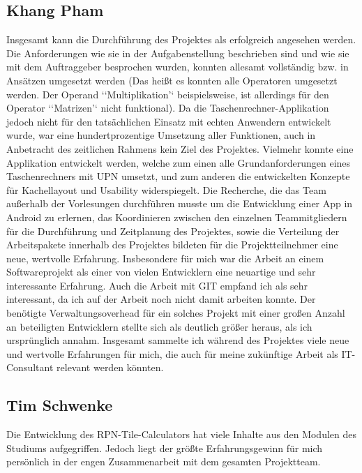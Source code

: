 \subsection{Khang Pham}
Insgesamt kann die Durchführung des Projektes als erfolgreich angesehen werden. Die Anforderungen wie sie in der Aufgabenstellung beschrieben sind und wie sie mit dem Auftraggeber besprochen wurden, konnten allesamt vollständig bzw. in Ansätzen umgesetzt werden (Das heißt es konnten alle Operatoren umgesetzt werden. Der Operand ‘‘Multiplikation’‘ beispielsweise, ist allerdings für den Operator ‘‘Matrizen’‘ nicht funktional). Da die Taschenrechner-Applikation jedoch nicht für den tatsächlichen Einsatz mit echten Anwendern entwickelt wurde, war eine hundertprozentige Umsetzung aller Funktionen, auch in Anbetracht des zeitlichen Rahmens kein Ziel des Projektes. Vielmehr konnte eine Applikation entwickelt werden, welche zum einen alle Grundanforderungen eines Taschenrechners mit UPN umsetzt, und zum anderen die entwickelten Konzepte für Kachellayout und Usability widerspiegelt. Die Recherche, die das Team außerhalb der Vorlesungen durchführen musste um die Entwicklung einer App in Android zu erlernen, das Koordinieren zwischen den einzelnen Teammitgliedern für die Durchführung und Zeitplanung des Projektes, sowie die Verteilung der Arbeitspakete innerhalb des Projektes bildeten für die Projektteilnehmer eine neue, wertvolle Erfahrung.
Insbesondere für mich war die Arbeit an einem Softwareprojekt als einer von vielen Entwicklern eine neuartige und sehr interessante Erfahrung. Auch die Arbeit mit GIT empfand ich als sehr interessant, da ich auf der Arbeit noch nicht damit arbeiten konnte. Der benötigte Verwaltungsoverhead für ein solches Projekt mit einer großen Anzahl an beteiligten Entwicklern stellte sich als deutlich größer heraus, als ich ursprünglich annahm. Insgesamt sammelte ich während des Projektes viele neue und wertvolle Erfahrungen für mich, die auch für meine zukünftige Arbeit als IT-Consultant relevant werden könnten. 

\clearpage

\subsection{Tim Schwenke}

Die Entwicklung des RPN-Tile-Calculators hat viele Inhalte aus den Modulen des Studiums aufgegriffen. Jedoch liegt der grö\ss te Erfahrungsgewinn für mich persönlich in der engen Zusammenarbeit mit dem gesamten Projektteam.

